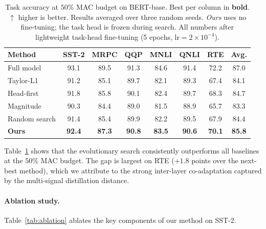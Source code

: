 \documentclass{article}
\begin{document}
\begin{table}[t]
\centering
\caption{%
  Task accuracy at $50\%$ MAC budget on BERT-base.
  Best per column in \textbf{bold}.
  $\uparrow$ higher is better.
  Results averaged over three random seeds.
  \emph{Ours} uses no fine-tuning; the task head is frozen during
  search.  All numbers after lightweight task-head fine-tuning
  (5 epochs, $\text{lr}=2\times10^{-4}$).
}
\label{tab:results}
\small
\setlength{\tabcolsep}{5pt}
\begin{tabular}{@{}lccccccc@{}}
\toprule
Method & SST-2 & MRPC & QQP & MNLI & QNLI & RTE & Avg.\\
\midrule
Full model  & 93.1 & 89.5 & 91.3 & 84.6 & 91.4 & 72.2 & 87.0\\
\midrule
Taylor-L1   & 91.2 & 85.1 & 89.7 & 82.1 & 89.3 & 67.4 & 84.1\\
Head-first  & 91.8 & 85.8 & 90.1 & 82.4 & 89.7 & 68.3 & 84.7\\
Magnitude   & 90.3 & 84.4 & 89.0 & 81.5 & 88.9 & 65.7 & 83.3\\
Random search & 91.4 & 85.4 & 89.9 & 82.2 & 89.5 & 67.9 & 84.4\\
\midrule
\textbf{Ours} & \textbf{92.4} & \textbf{87.3} & \textbf{90.8} &
                \textbf{83.5} & \textbf{90.6} & \textbf{70.1} & \textbf{85.8}\\
\bottomrule
\end{tabular}
\end{table}

Table~\ref{tab:results} shows that the evolutionary search consistently
outperforms all baselines at the $50\%$ MAC budget.  The gap is largest
on RTE (+$1.8$ points over the next-best method), which we attribute to
the strong inter-layer co-adaptation captured by the multi-signal
distillation distance.

\paragraph{Ablation study.}
Table~\ref{tab:ablation} ablates the key components of our method on
SST-2.
\end{document}

